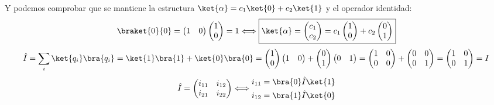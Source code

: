 \documentclass{report}
\begin{document}
{      Y podemos comprobar que se mantiene la estructura $\ket{\alpha}=c_1\ket{0}+c_2\ket{1}$ y el operador identidad:
      \[\braket{0}{0}=\left(\begin{matrix}1&0\end{matrix}\right)\left(\begin{matrix}1\\0\end{matrix}\right)=1\Longleftrightarrow
      \boxed{\ket{\alpha}=\left(\begin{matrix}c_1\\c_2\end{matrix}\right)=c_1\left(\begin{matrix}1\\0\end{matrix}\right)+c_2\left(\begin{matrix}0\\1\end{matrix}\right)}\]
      \[\hat{I}=\sum_i\ket{q_i}\bra{q_i}=\ket{1}\bra{1}+\ket{0}\bra{0}=
      \left(\begin{matrix}1\\0\end{matrix}\right)\left(\begin{matrix}1&0\end{matrix}\right)+
      \left(\begin{matrix}0\\1\end{matrix}\right)\left(\begin{matrix}0&1\end{matrix}\right)=
      \left(\begin{matrix}1&0\\0&0\end{matrix}\right)+\left(\begin{matrix}0&0\\0&1\end{matrix}\right)=
      \left(\begin{matrix}1&0\\0&1\end{matrix}\right)=I\]
      \[\hat{I}=\left(\begin{matrix}i_{11}&i_{12}\\i_{21}&i_{22}\end{matrix}\right)\Longleftrightarrow
      \begin{aligned}i_{11}=\bra{0}\hat{I}\ket{1}\\
                    i_{12}=\bra{1}\hat{I}\ket{0}\end{aligned}\]
    }
\end{document}
